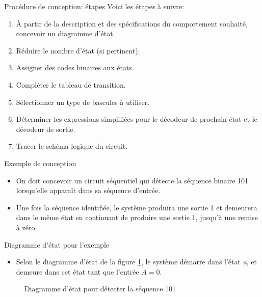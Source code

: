 \documentclass[presentation]{beamer}
\begin{document}
\begin{frame}[label={sec:org37f28b7}]{Procédure de conception: étapes}
Voici les étapes à suivre:

\begin{enumerate}
\item À partir de la description et des spécifications du comportement
souhaité, concevoir un diagramme d'état.
\item Réduire le nombre d'état (si pertinent).
\item Assigner des codes binaires aux états.
\item Compléter le tableau de transition.
\item Sélectionner un type de bascules à utiliser.
\item Déterminer les expressions simplifiées pour le décodeur de prochain
état et le décodeur de sortie.
\item Tracer le schéma logique du circuit.
\end{enumerate}
\end{frame}

\begin{frame}[label={sec:org0944ec9}]{Exemple de conception}
\begin{itemize}
\item On doit concevoir un circuit séquentiel qui détecte la séquence binaire 101 lorsqu'elle apparaît dans sa séquence d'entrée.

\item Une fois la séquence identifiée, le système produira une sortie 1 et demeurera dans le même état en continuant de produire une sortie 1, jusqu'à une remise à zéro.
\end{itemize}
\end{frame}

\begin{frame}[label={sec:org90619d4}]{Diagramme d'état pour l'exemple}
\begin{itemize}
\item Selon le diagramme d'état de la figure \ref{fig:org1b4f769}, le système démarre dans l'état \emph{a}, et demeure dans cet état tant que l'entrée \(A=0\).
\end{itemize}

\begin{figure}[htbp]
\centering

\caption{\label{fig:org1b4f769}Diagramme d'état pour détecter la séquence 101}
\end{figure}
\end{frame}
\end{document}
